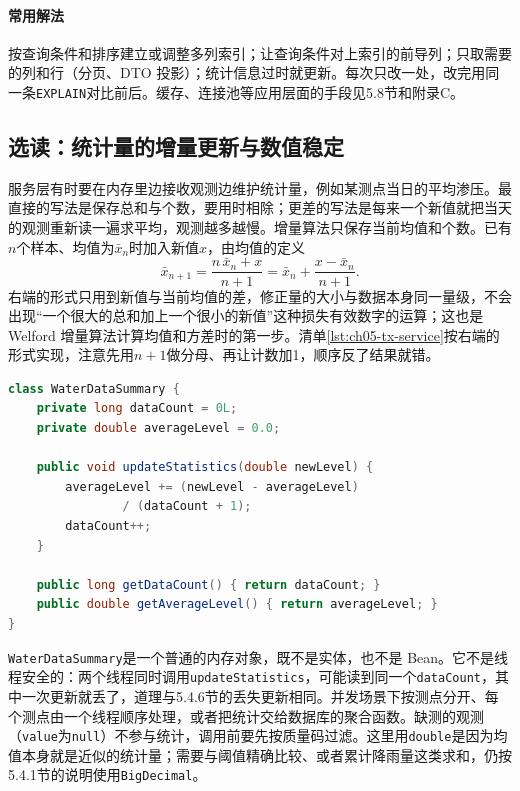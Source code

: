 \paragraph{常用解法}按查询条件和排序建立或调整多列索引；让查询条件对上索引的前导列；只取需要的列和行（分页、DTO 投影）；统计信息过时就更新。每次只改一处，改完用同一条\texttt{EXPLAIN}对比前后。缓存、连接池等应用层面的手段见5.8节和附录C。

\subsection{选读：统计量的增量更新与数值稳定}

服务层有时要在内存里边接收观测边维护统计量，例如某测点当日的平均渗压。最直接的写法是保存总和与个数，要用时相除；更差的写法是每来一个新值就把当天的观测重新读一遍求平均，观测越多越慢。增量算法只保存当前均值和个数。已有$n$个样本、均值为$\bar{x}_n$时加入新值$x$，由均值的定义
\[
  \bar{x}_{n+1}=\frac{n\,\bar{x}_n+x}{n+1}
  =\bar{x}_n+\frac{x-\bar{x}_n}{n+1}.
\]
右端的形式只用到新值与当前均值的差，修正量的大小与数据本身同一量级，不会出现“一个很大的总和加上一个很小的新值”这种损失有效数字的运算；这也是 Welford 增量算法计算均值和方差时的第一步。清单\ref{lst:ch05-tx-service}按右端的形式实现，注意先用$n+1$做分母、再让计数加1，顺序反了结果就错。

\begin{lstlisting}[label={lst:ch05-tx-service},language=Java,caption={增量均值的数值稳定实现}]
class WaterDataSummary {
    private long dataCount = 0L;
    private double averageLevel = 0.0;

    public void updateStatistics(double newLevel) {
        averageLevel += (newLevel - averageLevel)
                / (dataCount + 1);
        dataCount++;
    }

    public long getDataCount() { return dataCount; }
    public double getAverageLevel() { return averageLevel; }
}
\end{lstlisting}

\texttt{WaterDataSummary}是一个普通的内存对象，既不是实体，也不是 Bean。它不是线程安全的：两个线程同时调用\texttt{updateStatistics}，可能读到同一个\texttt{dataCount}，其中一次更新就丢了，道理与5.4.6节的丢失更新相同。并发场景下按测点分开、每个测点由一个线程顺序处理，或者把统计交给数据库的聚合函数。缺测的观测（\texttt{value}为\texttt{null}）不参与统计，调用前要先按质量码过滤。这里用\texttt{double}是因为均值本身就是近似的统计量；需要与阈值精确比较、或者累计降雨量这类求和，仍按5.4.1节的说明使用\texttt{BigDecimal}。

